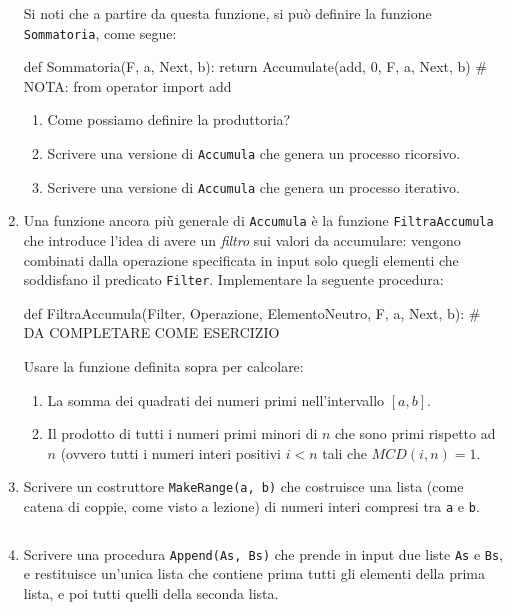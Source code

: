 \documentclass[11pt,a4]{article}
\newcommand{\mybox}[2]{$\quad$\fbox{
\begin{minipage}{#1cm}
\hfill\vspace{#2cm}
\end{minipage}
}}
\begin{document}
\begin{enumerate}
Si noti che a partire da questa funzione, si può definire la funzione {\tt Sommatoria}, come segue:
\begin{python}
def Sommatoria(F, a, Next, b):
    return Accumulate(add, 0, F, a, Next, b) # NOTA: from operator import add
\end{python}

\begin{enumerate}
\item Come possiamo definire la produttoria?
\item Scrivere una versione di {\tt Accumula} che genera un processo ricorsivo. 
\item Scrivere una versione di {\tt Accumula} che genera un processo iterativo. 
\end{enumerate}

\item Una funzione ancora più generale di {\tt Accumula} è la funzione {\tt FiltraAccumula} che introduce l'idea di 
avere un {\it filtro} sui valori da accumulare: vengono combinati dalla operazione specificata in input solo quegli elementi
che soddisfano il predicato {\tt Filter}. Implementare la seguente procedura:
\begin{python}
def FiltraAccumula(Filter, Operazione, ElementoNeutro, F, a, Next, b):
    # DA COMPLETARE COME ESERCIZIO
\end{python}
Usare la funzione definita sopra per calcolare:
\begin{enumerate}
\item La somma dei quadrati dei numeri primi nell'intervallo $[a,b]$.
\item Il prodotto di tutti i numeri primi minori di $n$ che sono primi rispetto ad $n$ (ovvero tutti i numeri interi positivi
$i < n$ tali che $MCD(i,n) = 1$.
\end{enumerate}

\item Scrivere un costruttore {\tt MakeRange(a, b)} che costruisce una lista (come catena di coppie, come visto a lezione)
di numeri interi compresi tra {\tt a} e {\tt b}.

\mybox{15}{1.5}

\item Scrivere una procedura {\tt Append(As, Bs)} che prende in input due liste {\tt As} e {\tt Bs}, 
e restituisce un'unica lista che contiene prima tutti gli elementi della prima lista, e poi tutti quelli della seconda lista.


\end{enumerate}
\end{document}
